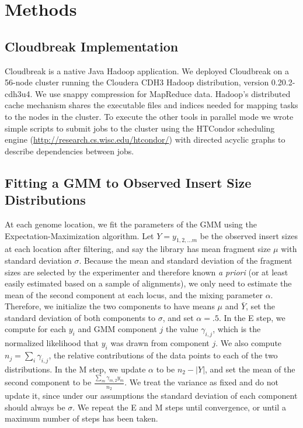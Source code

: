 \documentclass[10pt]{bmc_article}
\newenvironment{bmcformat}{\fussy\setboolean{publ}{true}}{\fussy}
\begin{document}
\begin{bmcformat}
  
\section*{Methods}

\subsection*{Cloudbreak Implementation}
Cloudbreak is a native Java Hadoop application. We deployed Cloudbreak on a 56-node cluster running the Cloudera CDH3 Hadoop distribution, version 0.20.2-cdh3u4. We use snappy compression for MapReduce data. Hadoop's distributed cache mechanism shares the executable files and indices needed for mapping tasks to the nodes in the cluster. To execute the other tools in parallel mode we wrote simple scripts to submit jobs to the cluster using the HTCondor scheduling engine (\url{http://research.cs.wisc.edu/htcondor/}) with directed acyclic graphs to describe dependencies between jobs. 

\subsection*{Fitting a GMM to Observed Insert Size Distributions}
At each genome location, we fit the parameters of the GMM using the Expectation-Maximization algorithm. Let $Y = y_{1,2, \ldots m}$ be the observed insert sizes at each location after filtering, and say the library has mean fragment size $\mu$ with standard deviation $\sigma$. Because the mean and standard deviation of the fragment sizes are selected by the experimenter and therefore known \emph{a priori} (or at least easily estimated based on a sample of alignments), we only need to estimate the mean of the second component at each locus, and the mixing parameter $\alpha$. Therefore, we initialize the two components to have means $\mu$ and $\bar{Y}$, set the standard deviation of both components to $\sigma$, and set $\alpha = .5$. In the E step, we compute for each $y_i$ and GMM component $j$ the value $\gamma_{i,j}$, which is the normalized likelihood that $y_i$ was drawn from component $j$. We also compute $n_j = \sum_i{\gamma_{i,j}}$, the relative contributions of the data points to each of the two distributions. In the M step, we update $\alpha$ to be $n_2 - \left|Y\right|$, and set the mean of the second component to be $\frac{\sum_m{\gamma_{m,2}y_m}}{n_2}$. We treat the variance as fixed and do not update it, since under our assumptions the standard deviation of each component should always be $\sigma$. We repeat the E and M steps until convergence, or until a maximum number of steps has been taken.


\end{bmcformat}
\end{document}
